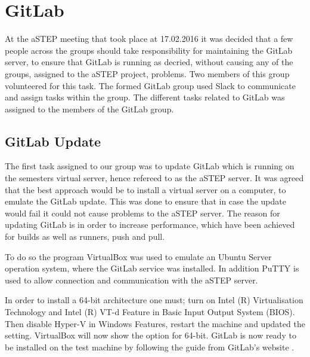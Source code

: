 \section{GitLab}
At the aSTEP meeting that took place at 17.02.2016 it was decided that a few people across the groups should take responsibility for maintaining the GitLab server, to ensure that GitLab is running as decried, without causing any of the groups, assigned to the aSTEP project, problems. Two members of this group volunteered for this task. 
The formed GitLab group used Slack to communicate and assign tasks within the group. The different tasks related to GitLab was assigned to the members of the GitLab group.

\subsection*{GitLab Update}
The first task assigned to our group was to update GitLab which is running on the semesters virtual server, hence refereed to as the aSTEP server. It was agreed that the best approach would be to install a virtual server on a computer, to emulate the GitLab update. This was done to ensure that in case the update would fail it could not cause problems to the aSTEP server.
The reason for updating GitLab is in order to increase performance, which have been achieved for builds as well as runners, push and pull. 

To do so the program VirtualBox \cite{vbox} was used to emulate an Ubuntu Server operation system, where the GitLab service was installed. In addition PuTTY \cite{putty} is used to allow connection and communication with the aSTEP server.

In order to install a 64-bit architecture one must; turn on Intel (R) Virtualisation Technology and Intel (R) VT-d Feature in Basic Input Output System (BIOS). Then disable Hyper-V in Windows Features, restart the machine and updated the setting. VirtualBox will now show the option for 64-bit. 
GitLab is now ready to be installed on the test machine by following the guide from GitLab's website \cite{gitlab_guide}.


